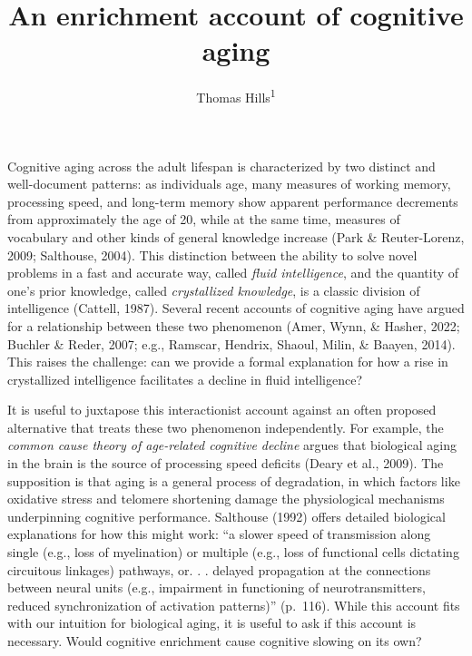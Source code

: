 \documentclass[
  man]{apa6}
\title{An enrichment account of cognitive aging}
\author{Thomas Hills\textsuperscript{1}}
\date{}
\affiliation{\vspace{0.5cm}\textsuperscript{1} University of Warwick}
\begin{document}
\maketitle

Cognitive aging across the adult lifespan is characterized by two distinct and well-document patterns: as individuals age, many measures of working memory, processing speed, and long-term memory show apparent performance decrements from approximately the age of 20, while at the same time, measures of vocabulary and other kinds of general knowledge increase (Park \& Reuter-Lorenz, 2009; Salthouse, 2004). This distinction between the ability to solve novel problems in a fast and accurate way, called \emph{fluid intelligence}, and the quantity of one's prior knowledge, called \emph{crystallized knowledge}, is a classic division of intelligence (Cattell, 1987). Several recent accounts of cognitive aging have argued for a relationship between these two phenomenon (Amer, Wynn, \& Hasher, 2022; Buchler \& Reder, 2007; e.g., Ramscar, Hendrix, Shaoul, Milin, \& Baayen, 2014). This raises the challenge: can we provide a formal explanation for how a rise in crystallized intelligence facilitates a decline in fluid intelligence?

It is useful to juxtapose this interactionist account against an often proposed alternative that treats these two phenomenon independently. For example, the \emph{common cause theory of age-related cognitive decline} argues that biological aging in the brain is the source of processing speed deficits (Deary et al., 2009). The supposition is that aging is a general process of degradation, in which factors like oxidative stress and telomere shortening damage the physiological mechanisms underpinning cognitive performance. Salthouse (1992) offers detailed biological explanations for how this might work: ``a slower speed of transmission along single (e.g., loss of myelination) or multiple (e.g., loss of functional cells dictating circuitous linkages) pathways, or. . . delayed propagation at the connections between neural units (e.g., impairment in functioning of neurotransmitters, reduced synchronization of activation patterns)'' (p.~116). While this account fits with our intuition for biological aging, it is useful to ask if this account is necessary. Would cognitive enrichment cause cognitive slowing on its own?
\end{document}
